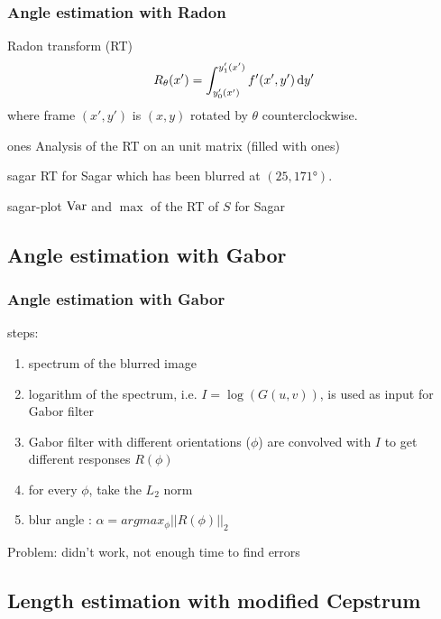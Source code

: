 \begin{frame}[allowframebreaks]
  \frametitle{Angle estimation with Radon}
  \begin{block}{Radon transform (RT)}
    \[ R_\theta(x') = \int_{y_0'(x')}^{y_1'(x')} f'(x',y') \operatorname{d}\! y' \]
    where frame $(x',y')$ is $(x,y)$ rotated by $\theta$ counterclockwise.
  \end{block}

  \begin{myfig}{ones}
    {Analysis of the RT on an unit matrix (filled with ones)}
  \end{myfig}

  \begin{myfig}{sagar}
    {RT for Sagar which has been blurred at $(25,\ang{171})$.}
  \end{myfig}

  \begin{myfig}{sagar-plot}
    {$\operatorname{Var}$ and $\max$ of the RT of $S$ for Sagar}
  \end{myfig}
\end{frame}

\subsection{Angle estimation with Gabor}
\begin{frame}
	\frametitle{Angle estimation with Gabor}
	steps:
	\begin{enumerate}
	\item spectrum of the blurred image
	\item logarithm of the spectrum, i.e. $I=\log(G(u,v))$, is used as input for Gabor filter
	\item Gabor filter with different orientations ($\phi$) are convolved with $I$ to get different responses $R(\phi)$
	\item for every $\phi$, take the $L_2$ norm
	\item blur angle : $\alpha = arg{max_{\phi}||R(\phi)||_2}$
	\end{enumerate}
	
	Problem: didn't work, not enough time to find errors
\end{frame}


\subsection{Length estimation with modified Cepstrum}
